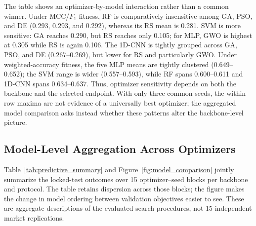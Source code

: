 The table shows an optimizer-by-model interaction rather than a common winner. Under MCC/$F_1$ fitness, RF is comparatively insensitive among GA, PSO, and DE (0.293, 0.293, and 0.292), whereas its RS mean is 0.281. SVM is more sensitive: GA reaches 0.290, but RS reaches only 0.105; for MLP, GWO is highest at 0.305 while RS is again 0.106. The 1D-CNN is tightly grouped across GA, PSO, and DE (0.267--0.269), but lower for RS and particularly GWO. Under weighted-accuracy fitness, the five MLP means are tightly clustered (0.649--0.652); the SVM range is wider (0.557--0.593), while RF spans 0.600--0.611 and 1D-CNN spans 0.634--0.637. Thus, optimizer sensitivity depends on both the backbone and the selected endpoint. With only three common seeds, the within-row maxima are not evidence of a universally best optimizer; the aggregated model comparison asks instead whether these patterns alter the backbone-level picture.

\subsection{Model-Level Aggregation Across Optimizers}

Table~\ref{tab:predictive_summary} and Figure~\ref{fig:model_comparison} jointly summarize the locked-test outcomes over 15 optimizer--seed blocks per backbone and protocol. The table retains dispersion across those blocks; the figure makes the change in model ordering between validation objectives easier to see. These are aggregate descriptions of the evaluated search procedures, not 15 independent market replications.

